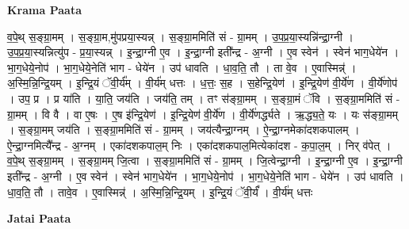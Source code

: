 \documentclass[17pt]{extarticle}
\begin{document}
\textbf{Krama Paata} \newline

व॒पे॒थ् स॒ङ्ग्रा॒मम् । स॒ङ्ग्रा॒म,मु॑पप्रया॒स्यन्न् । स॒ङ्ग्रा॒ममिति॑ सं - ग्रा॒मम् । उ॒प॒प्र॒या॒स्यन्नि॑न्द्रा॒ग्नी । उ॒प॒प्र॒या॒स्यन्नित्यु॑प - प्र॒या॒स्यन्न् । इ॒न्द्रा॒ग्नी ए॒व । इ॒न्द्रा॒ग्नी इती᳚न्द्र - अ॒ग्नी । ए॒व स्वेन॑ । स्वेन॑ भाग॒धेये॑न । भा॒ग॒धेये॒नोप॑ । भा॒ग॒धेये॒नेति॑ भाग - धेये॑न । उप॑ धावति । धा॒व॒ति॒ तौ । ता वे॒व । ए॒वास्मिन्न्॑ । अ॒स्मि॒न्नि॒न्द्रि॒यम् । इ॒न्द्रि॒यं ॅवी॒र्य᳚म् । वी॒र्य॑म् धत्तः । ध॒त्तः॒ स॒ह । स॒हेन्द्रि॒येण॑ । इ॒न्द्रि॒येण॑ वी॒र्ये॑ण । वी॒र्ये॑णोप॑ । उप॒ प्र । प्र या॑ति । या॒ति॒ जय॑ति । जय॑ति॒ तम् । तꣳ स॑ङ्ग्रा॒मम् । स॒ङ्ग्रा॒मं ॅवि । स॒ङ्ग्रा॒ममिति॑ सं - ग्रा॒मम् । वि वै । वा ए॒षः । ए॒ष इ॑न्द्रि॒येण॑ । इ॒न्द्रि॒येण॑ वी॒र्ये॑ण । वी॒र्ये॑णर्द्ध्यते । ऋ॒द्ध्य॒ते॒ यः । यः स॑ङ्ग्रा॒मम् । स॒ङ्ग्रा॒मम् जय॑ति । स॒ङ्ग्रा॒ममिति॑ सं - ग्रा॒मम् । जय॑त्यैन्द्रा॒ग्नम् । ऐ॒न्द्रा॒ग्नमेका॑दशकपालम् । ऐ॒न्द्रा॒ग्नमित्यै᳚न्द्र - अ॒ग्नम् । एका॑दशकपाल॒म् निः । एका॑दशकपाल॒मित्येका॑दश - क॒पा॒ल॒म् । निर् व॑पेत् । व॒पे॒थ् स॒ङ्ग्रा॒मम् । स॒ङ्ग्रा॒मम् जि॒त्वा । स॒ङ्ग्रा॒ममिति॑ सं - ग्रा॒मम् । जि॒त्वेन्द्रा॒ग्नी । इ॒न्द्रा॒ग्नी ए॒व । इ॒न्द्रा॒ग्नी इती᳚न्द्र - अ॒ग्नी । ए॒व स्वेन॑ । स्वेन॑ भाग॒धेये॑न । भा॒ग॒धेये॒नोप॑ । भा॒ग॒धेये॒नेति॑ भाग - धेये॑न । उप॑ धावति । धा॒व॒ति॒ तौ । तावे॒व । ए॒वास्मिन्न्॑ । अ॒स्मि॒न्नि॒न्द्रि॒यम् । इ॒न्द्रि॒यं ॅवी॒र्यं᳚ । वी॒र्य॑म् धत्तः \newline

\textbf{Jatai Paata} \newline
\end{document}
